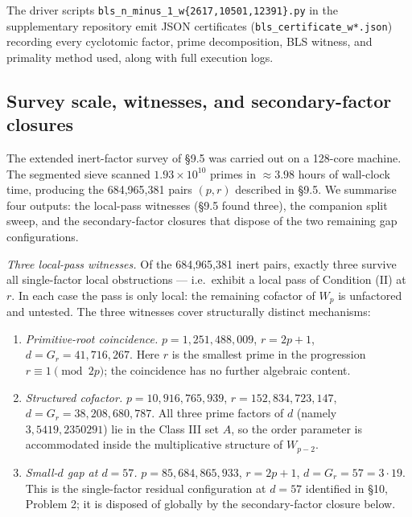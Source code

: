 \documentclass[12pt]{article}
\theoremstyle{plain}
\theoremstyle{definition}
\theoremstyle{remark}
\begin{document}
The driver scripts
\texttt{bls\_n\_minus\_1\_w\{2617,10501,12391\}.py}
in the supplementary repository emit JSON certificates
(\texttt{bls\_certificate\_w*.json}) recording every cyclotomic factor,
prime decomposition, BLS witness, and primality method used,
along with full execution logs.

\subsection{Survey scale, witnesses, and secondary-factor closures}


The extended inert-factor survey of \S9.5 was carried out on a
128-core machine. The segmented sieve scanned
\(1.93 \times 10^{10}\) primes in \(\approx 3.98\) hours of
wall-clock time, producing the 684{,}965{,}381 pairs \((p,r)\)
described in \S9.5.
We summarise four outputs: the local-pass witnesses (\S9.5
found three), the companion split sweep, and the secondary-factor
closures that dispose of the two remaining gap configurations.

\emph{Three local-pass witnesses.} Of the 684{,}965{,}381 inert
pairs, exactly three survive all single-factor local
obstructions --- i.e.\ exhibit a local pass of Condition (II) at
\(r\). In each case the pass is only local: the remaining
cofactor of \(W_p\) is unfactored and untested. The three
witnesses cover structurally distinct mechanisms:

\begin{enumerate}
\item \emph{Primitive-root coincidence.}
  \(p = 1{,}251{,}488{,}009\), \(r = 2p+1\),
  \(d = G_r = 41{,}716{,}267\). Here \(r\) is the smallest prime
  in the progression \(r \equiv 1 \pmod{2p}\); the coincidence
  has no further algebraic content.
\item \emph{Structured cofactor.}
  \(p = 10{,}916{,}765{,}939\), \(r = 152{,}834{,}723{,}147\),
  \(d = G_r = 38{,}208{,}680{,}787\). All three prime factors of
  \(d\) (namely \(3, 5419, 2350291\)) lie in the Class III set
  \(A\), so the order parameter is accommodated inside the
  multiplicative structure of \(W_{p-2}\).
\item \emph{Small-\(d\) gap at \(d = 57\).}
  \(p = 85{,}684{,}865{,}933\), \(r = 2p+1\),
  \(d = G_r = 57 = 3 \cdot 19\). This is the single-factor
  residual configuration at \(d = 57\) identified in \S10,
  Problem 2; it is disposed of globally by the secondary-factor
  closure below.
\end{enumerate}
\end{document}
